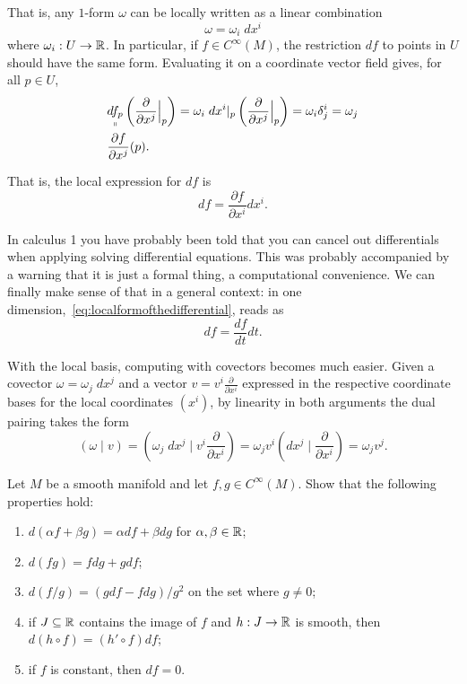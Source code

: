 That is, any $1$-form $\omega$ can be locally written as a linear combination
\begin{equation}
  \omega = \omega_i\; dx^i
\end{equation}
where $\omega_i:U\to\mathbb{R}$.
In particular, if $f\in C^\infty(M)$, the restriction $df$ to points in $U$ should have the same form.
Evaluating it on a coordinate vector field gives, for all $p\in U$,
\begin{align}
  &\underset{\shortparallel}{df_p} \left(\frac{\partial}{\partial x^j}\Big|_p\right)
  = \omega_i\; dx^i|_p \left(\frac{\partial}{\partial x^j}\Big|_p\right) = 
  \omega_i \delta^i_j = \omega_j \\
  & \frac{\partial f}{\partial x^j}(p).
\end{align}

That is, the local expression for $df$ is
\begin{equation}\label{eq:localformofthedifferential}
  df =  \frac{\partial f}{\partial x^i} dx^i.
\end{equation}

\begin{remark}
  In calculus 1 you have probably been told that you can cancel out differentials when applying solving differential equations.
  This was probably accompanied by a warning that it is just a formal thing, a computational convenience.
  We can finally make sense of that in a general context: in one dimension,~\eqref{eq:localformofthedifferential}, reads as
  \begin{equation}
    d f = \frac{df}{dt}dt.
  \end{equation}
\end{remark}

With the local basis, computing with covectors becomes much easier.
Given a covector $\omega = \omega_j\; dx^j$ and a vector $v = v^i \frac{\partial}{\partial x^i}$ expressed in the respective coordinate bases for the local coordinates $(x^i)$, by linearity in both arguments the dual pairing takes the form
\begin{equation}\label{eq:localdualpairing}
  (\omega \mid v) =
  \left(\omega_j\; dx^j \;\Big |\; v^i \frac{\partial}{\partial x^i} \right) =
  \omega_j v^i \left(dx^j \;\Big |\; \frac{\partial}{\partial x^i} \right) =
  \omega_j v^j.
\end{equation}

\begin{exercise}
  Let $M$ be a smooth manifold and let $f,g\in C^\infty(M)$. Show that the following properties hold:
  \begin{enumerate}
    \item $d(\alpha f + \beta g) = \alpha df + \beta dg$ for $\alpha,\beta\in\mathbb{R}$;
    \item $d(fg) = f dg + g df$;
    \item $d(f/g) = (g df - f dg)/g^2$ on the set where $g\neq 0$;
    \item if $J\subseteq\mathbb{R}$ contains the image of $f$ and $h:J\to\mathbb{R}$ is smooth, then $d(h\circ f) = (h'\circ f) df$;
    \item if $f$ is constant, then $df= 0$.
  \end{enumerate}
\end{exercise}

